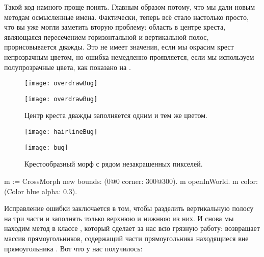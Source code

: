 \documentclass[a4paper,10pt,twoside]{book}
\begin{document}
Такой код намного проще понять. Главным образом потому, что мы дали новым методам осмысленные имена.
Фактически, теперь всё стало настолько просто, что вы уже могли заметить вторую проблему: область в центре креста, являющаяся пересечением горизонтальной и вертикальной полос, прорисовывается дважды.
Это не имеет значения, если мы окрасим крест непрозрачным цветом, но ошибка немедленно проявляется, если мы используем полупрозрачные цвета, как показано на .

\begin{figure}[t]
\begin{minipage}{0.48\textwidth}
	\ifluluelse
		{\centerline{\texttt{[image: overdrawBug]}}}
		{\centerline{\texttt{[image: overdrawBug]}}}
	\caption{Центр креста дважды заполняется одним и тем же цветом.
		}
\end{minipage}
\hfill
\begin{minipage}{0.48\textwidth}
	\ifluluelse
		{\centerline{\texttt{[image: hairlineBug]}}}
		{\centerline{\texttt{[image: bug]}}}
	\caption{Крестообразный морф с рядом незакрашенных пикселей.
		}
\end{minipage}
\end{figure}


\begin{code}{}
m := CrossMorph new bounds: (0@0 corner: 300@300).
m openInWorld.
m color: (Color blue alpha: 0.3).
\end{code}

\noindent
Исправление ошибки заключается в том, чтобы разделить вертикальную полосу на три части и заполнять только верхнюю и нижнюю из них.
И снова мы находим метод в классе , который сделает за нас всю грязную работу:  возвращает массив прямоугольников, содержащий части прямоугольника  находящиеся вне прямоугольника .
Вот что у нас получилось:
\end{document}
